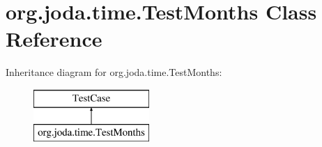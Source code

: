 \hypertarget{classorg_1_1joda_1_1time_1_1_test_months}{\section{org.\-joda.\-time.\-Test\-Months Class Reference}
\label{classorg_1_1joda_1_1time_1_1_test_months}
}
Inheritance diagram for org.\-joda.\-time.\-Test\-Months\-:\begin{figure}[H]
\begin{center}
\leavevmode
\includegraphics[height=2.000000cm]{classorg_1_1joda_1_1time_1_1_test_months}
\end{center}
\end{figure}
